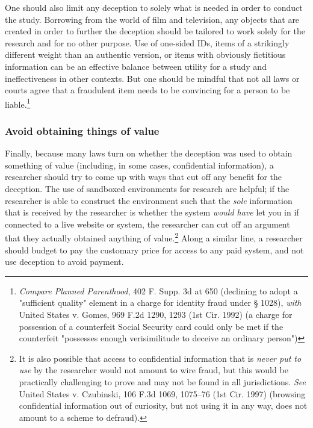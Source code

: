 One should also limit any deception to solely what is needed in order to conduct the study. Borrowing from the world of film and television, any objects that are created in order to further the deception should be tailored to work solely for the research and for no other purpose. Use of one-sided IDs, items of a strikingly different weight than an authentic version, or items with obviously fictitious information can be an effective balance between utility for a study and ineffectiveness in other contexts. But one should be mindful that not all laws or courts agree that a fraudulent item needs to be convincing for a person to be liable.\footnote{\textit{Compare Planned Parenthood}, 402 F. Supp. 3d at 650 (declining to adopt a "sufficient quality" element in a charge for identity fraud under § 1028), \textit{with} United States v. Gomes, 969 F.2d 1290, 1293 (1st Cir. 1992) (a charge for possession of a counterfeit Social Security card could only be met if the counterfeit "possesses enough verisimilitude to deceive an ordinary person")} 

\subsubsection{Avoid obtaining things of value}
Finally, because many laws turn on whether the deception was used to obtain something of value (including, in some cases, confidential information), a researcher should try to come up with ways that cut off any benefit for the deception. The use of sandboxed environments for research are helpful; if the researcher is able to construct the environment such that the \textit{sole} information that is received by the researcher is whether the system \textit{would have} let you in if connected to a live website or system, the researcher can cut off an argument that they actually obtained anything of value.\footnote{It is also possible that access to confidential information that is \textit{never put to use} by the researcher would not amount to wire fraud, but this would be practically challenging to prove and may not be found in all jurisdictions. \textit{See} United States v. Czubinski, 106 F.3d 1069, 1075–76 (1st Cir. 1997) (browsing confidential information out of curiosity, but not using it in any way, does not amount to a scheme to defraud).} Along a similar line, a researcher should budget to pay the customary price for access to any paid system, and not use deception to avoid payment. 

